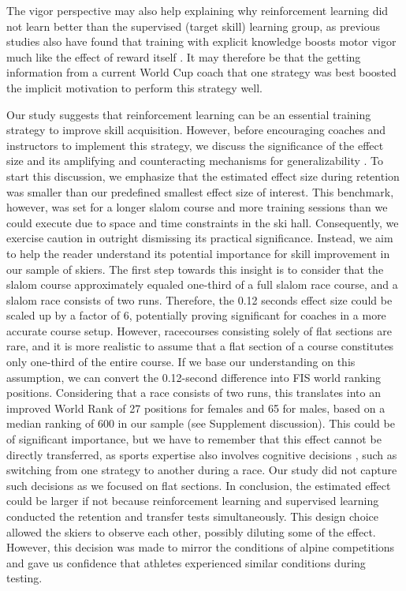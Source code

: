 \documentclass{article}
\begin{document}
The vigor perspective may also help explaining why reinforcement learning did not learn better than the supervised (target skill) learning group, as previous studies also have found that training with explicit knowledge boosts motor vigor much like the effect of reward itself \cite{anderson_rewards_2020, wong_explicit_2015}. It may therefore be that the getting information from a current World Cup coach that one strategy was best boosted the implicit motivation to perform this strategy well. 


Our study suggests that reinforcement learning can be an essential training strategy to improve skill acquisition. However, before encouraging coaches and instructors to implement this strategy, we discuss the significance of the effect size and its amplifying and counteracting mechanisms for generalizability \cite{anvari_not_2023}. To start this discussion, we emphasize that the estimated effect size during retention was smaller than our predefined smallest effect size of interest. This benchmark, however, was set for a longer slalom course and more training sessions than we could execute due to space and time constraints in the ski hall. Consequently, we exercise caution in outright dismissing its practical significance. Instead, we aim to help the reader understand its potential importance for skill improvement in our sample of skiers. The first step towards this insight is to consider that the slalom course approximately equaled one-third of a full slalom race course, and a slalom race consists of two runs. Therefore, the 0.12 seconds effect size could be scaled up by a factor of 6, potentially proving significant for coaches in a more accurate course setup. However, racecourses consisting solely of flat sections are rare, and it is more realistic to assume that a flat section of a course constitutes only one-third of the entire course. If we base our understanding on this assumption, we can convert the 0.12-second difference into FIS world ranking positions. Considering that a race consists of two runs, this translates into an improved World Rank of 27 positions for females and 65 for males, based on a median ranking of 600 in our sample (see Supplement discussion). This could be of significant importance, but we have to remember that this effect cannot be directly transferred, as sports expertise also involves cognitive decisions \cite{mangalam_investigating_2023, krakauer_motor_2019}, such as switching from one strategy to another during a race. Our study did not capture such decisions as we focused on flat sections. In conclusion, the estimated effect could be larger if not because reinforcement learning and supervised learning conducted the retention and transfer tests simultaneously. This design choice allowed the skiers to observe each other, possibly diluting some of the effect. However, this decision was made to mirror the conditions of alpine competitions and gave us confidence that athletes experienced similar conditions during testing. 
\end{document}
